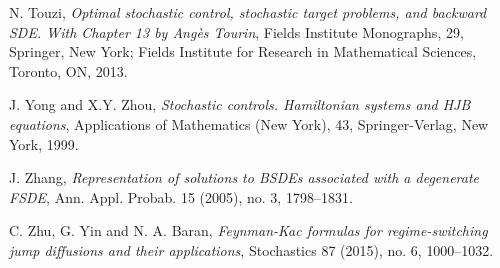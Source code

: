 \documentclass[amscd,amssymb,11pt]{article}
\numberwithin{theorem}{section}
\numberwithin{equation}{section}
\begin{document}
\begin{thebibliography}{99}
N. Touzi, {\it Optimal stochastic control, stochastic target problems, and backward SDE.
With Chapter 13 by Ang\`es Tourin}, Fields Institute Monographs, 29, Springer, New York; Fields Institute for Research in Mathematical Sciences, Toronto, ON, 2013.

J. Yong and X.Y. Zhou, {\it Stochastic controls. Hamiltonian systems and HJB equations}, Applications of Mathematics (New York), 43, Springer-Verlag, New York, 1999.

J. Zhang, {\it Representation of solutions to BSDEs associated with a degenerate FSDE}, Ann. Appl. Probab. 15 (2005), no. 3, 1798--1831.

C. Zhu, G. Yin and N. A. Baran, {\it Feynman-Kac formulas for regime-switching jump diffusions and their applications}, Stochastics 87 (2015), no. 6, 1000--1032.
\end{thebibliography}
\end{document}
